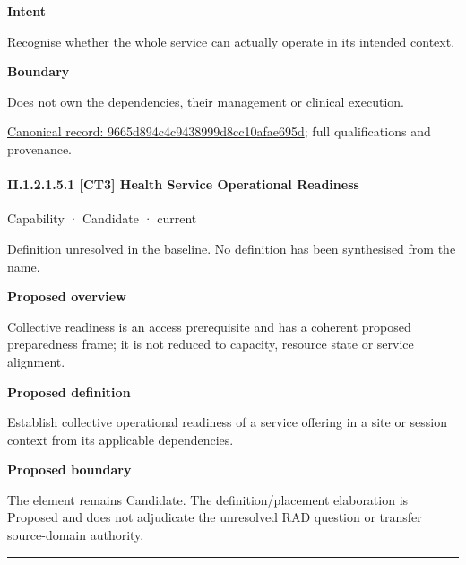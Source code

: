 \textbf{Intent}



Recognise whether the whole service can actually operate in its intended context.



\textbf{Boundary}



Does not own the dependencies, their management or clinical execution.


{\footnotesize \href{../../../../../../../continuum/strategy/capability/9665d894c4c9438999d8cc10afae695d.md}{Canonical record: 9665d894c4c9438999d8cc10afae695d}; full qualifications and provenance.}\par
\paragraph*{II.1.2.1.5.1 [CT3] Health Service Operational Readiness}
\label{navigation:II.1.2.1.5.1}

\label{element:cc91eb4017034939ab82b152bddf7b1c}
{\small Capability · Candidate · current}\par

Definition unresolved in the baseline. No definition has been synthesised from the name.



\textbf{Proposed overview}



Collective readiness is an access prerequisite and has a coherent proposed preparedness frame; it is not reduced to capacity, resource state or service alignment.



\textbf{Proposed definition}



Establish collective operational readiness of a service offering in a site or session context from its applicable dependencies.



\textbf{Proposed boundary}



The element remains Candidate. The definition/placement elaboration is Proposed and does not adjudicate the unresolved RAD question or transfer source-domain authority.



\medskip\hrule\medskip

